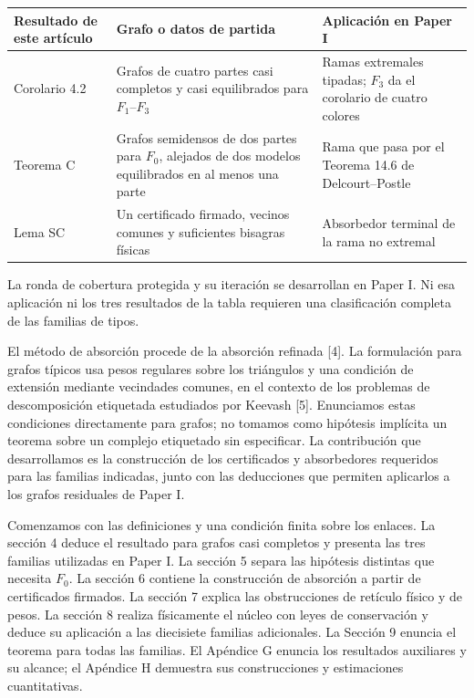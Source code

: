 \documentclass[spanish,11pt,a4paper]{article}
\begin{document}
{\begin{longtable}[]{@{}
  >{\raggedright\arraybackslash}p{}
  >{\raggedright\arraybackslash}p{}
  >{\raggedright\arraybackslash}p{}@{}}
\toprule\noalign{}
\begin{minipage}[b]{\linewidth}\raggedright
Resultado de este artículo
\end{minipage} & \begin{minipage}[b]{\linewidth}\raggedright
Grafo o datos de partida
\end{minipage} & \begin{minipage}[b]{\linewidth}\raggedright
Aplicación en Paper I
\end{minipage} \\
\midrule\noalign{}
\endhead
\bottomrule\noalign{}
\endlastfoot
Corolario 4.2 & Grafos de cuatro partes casi completos y casi equilibrados para \(F_1\)--\(F_3\) & Ramas extremales tipadas; \(F_3\) da el corolario de cuatro colores \\
Teorema C & Grafos semidensos de dos partes para \(F_0\), alejados de dos modelos equilibrados en al menos una parte & Rama que pasa por el Teorema 14.6 de Delcourt--Postle \\
Lema SC & Un certificado firmado, vecinos comunes y suficientes bisagras físicas & Absorbedor terminal de la rama no extremal \\
\end{longtable}
}

La ronda de cobertura protegida y su iteración se desarrollan en Paper I. Ni esa aplicación ni los tres resultados de la tabla requieren una clasificación completa de las familias de tipos.

El método de absorción procede de la absorción refinada {[}4{]}. La formulación para grafos típicos usa pesos regulares sobre los triángulos y una condición de extensión mediante vecindades comunes, en el contexto de los problemas de descomposición etiquetada estudiados por Keevash {[}5{]}. Enunciamos estas condiciones directamente para grafos; no tomamos como hipótesis implícita un teorema sobre un complejo etiquetado sin especificar. La contribución que desarrollamos es la construcción de los certificados y absorbedores requeridos para las familias indicadas, junto con las deducciones que permiten aplicarlos a los grafos residuales de Paper I.

Comenzamos con las definiciones y una condición finita sobre los enlaces. La sección 4 deduce el resultado para grafos casi completos y presenta las tres familias utilizadas en Paper I. La sección 5 separa las hipótesis distintas que necesita \(F_0\). La sección 6 contiene la construcción de absorción a partir de certificados firmados. La sección 7 explica las obstrucciones de retículo físico y de pesos. La sección 8 realiza físicamente el núcleo con leyes de conservación y deduce su aplicación a las diecisiete familias adicionales. La Sección 9 enuncia el teorema para todas las familias. El Apéndice G enuncia los resultados auxiliares y su alcance; el Apéndice H demuestra sus construcciones y estimaciones cuantitativas.
\end{document}
